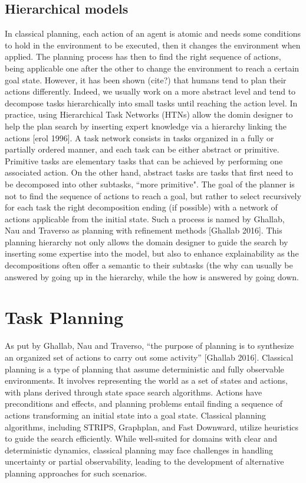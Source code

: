 \subsection{Hierarchical models}

In classical planning, each action of an agent is atomic and needs some conditions to hold in the environment to be executed, then it changes the environment when applied. The planning process has then to find the right sequence of actions, being applicable one after the other to change the environment to reach a certain goal state. 
However, it has been shown (cite?) that humans tend to plan their actions differently. Indeed, we usually work on a more abstract level and tend to decompose tasks hierarchically into small tasks until reaching the action level. In practice, using Hierarchical Task Networks (HTNs) allow the domin designer to help the plan search by inserting expert knowledge via a hierarchy linking the actions [erol 1996]. A task network consists in tasks organized in a fully or partially ordered manner, and each task can be either abstract or primitive. Primitive tasks are elementary tasks that can be achieved by performing one associated action. On the other hand, abstract tasks are tasks that first need to be decomposed into other subtasks, ``more primitive". The goal of the planner is not to find the sequence of actions to reach a goal, but rather to select recursively for each task the right decomposition ending (if possible) with a network of actions applicable from the initial state. Such a process is named by Ghallab, Nau and Traverso as planning with refinement methods [Ghallab 2016]. This planning hierarchy not only allows the domain designer to guide the search by inserting some expertise into the model, but also to enhance explainability as the decompositions often offer a semantic to their subtasks (the why can usually be answered by going up in the hierarchy, while the how is answered by going down. 

\section{Task Planning}

As put by Ghallab, Nau and Traverso, “the purpose of planning is to synthesize an organized set of actions to carry out some activity” [Ghallab 2016]. 
Classical planning is a type of planning that assume deterministic and fully observable environments. It involves representing the world as a set of states and actions, with plans derived through state space search algorithms. Actions have preconditions and effects, and planning problems entail finding a sequence of actions transforming an initial state into a goal state. Classical planning algorithms, including STRIPS, Graphplan, and Fast Downward, utilize heuristics to guide the search efficiently. While well-suited for domains with clear and deterministic dynamics, classical planning may face challenges in handling uncertainty or partial observability, leading to the development of alternative planning approaches for such scenarios.

